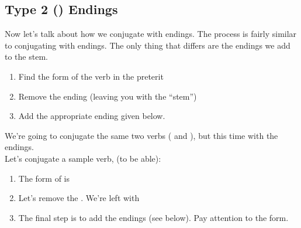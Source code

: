 \subsection{Type 2 () Endings}

Now let's talk about how we conjugate with  endings. The process is fairly similar to conjugating with  endings. The only thing that differs are the endings we add to the stem. \\

\begin{enumerate}[noitemsep]
	\item Find the  form of the verb in the preterit
	\item Remove the  ending (leaving you with the ``stem'')
	\item Add the appropriate ending given below. 
\end{enumerate}



We're going to conjugate the same two verbs ( and ), but this time with the  endings. \\

Let's conjugate a sample verb,  (to be able):
\begin{enumerate}[noitemsep]
	\item The  form of  is 
	\item Let's remove the . We're left with 
	\item The final step is to add the endings (see below). Pay attention to the  form. 
\end{enumerate}




